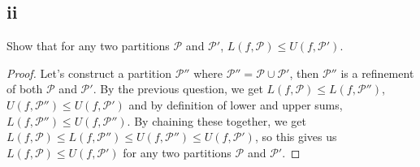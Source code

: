 \documentclass{article}
\begin{document}
\subsection*{ii}
Show that for any two partitions $\mathcal{P}$ and $\mathcal{P}'$, $L(f, \mathcal{P}) \leq U(f, \mathcal{P}')$. \\
\begin{proof}
    Let's construct a partition $\mathcal{P''}$ where $\mathcal{P}'' = \mathcal{P } \cup \mathcal{P'}$, then $\mathcal{P}''$ is a refinement of both $\mathcal{P}$ and $\mathcal{P}'$. By the previous question, we get $L(f, \mathcal{P}) \leq L(f, \mathcal{P}'')$, $U(f, \mathcal{P}'')\leq U (f, \mathcal{P}')$ and by definition of lower and upper sums, $L (f, \mathcal{P}'') \leq U (f, \mathcal{P}'')$. By chaining these together, we get $L(f, \mathcal{P}) \leq L(f, \mathcal{P}'') \leq U (f, \mathcal{P}'') \leq U (f, \mathcal{P}')$, so this gives us $L(f, \mathcal{P}) \leq U (f, \mathcal{P}')$ for any two partitions $\mathcal{P}$ and $\mathcal{P'}.$
\end{proof}
\end{document}
